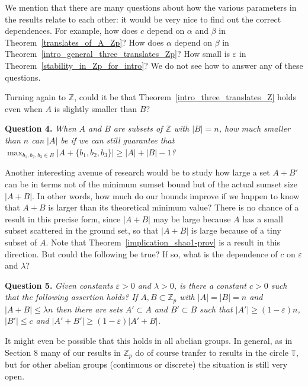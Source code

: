 \documentclass[12pt,reqno]{amsart}
\theoremstyle{definition}
\renewcommand\le{\leqslant}
\renewcommand\ge{\geqslant}
\begin{document}
\vspace{10pt}
We mention that there are many questions about how the various parameters in the results relate to each
other: it would be very nice to find out the correct dependences. For example, how does $c$ depend on $\alpha$ and $\beta$ in Theorem~\ref{translates_of_A_Zp}? How does $\alpha$ depend on $\beta$ in
Theorem~\ref{intro_general_three_translates_Zp}? How small is $\varepsilon$ in
Theorem~\ref{stability_in_Zp_for_intro}? We do not see how to answer any of these questions.

\vspace{5pt}
Turning again to ${\mathbb Z}$, could it be that Theorem~\ref{intro_three_translates_Z} holds
even when $A$ is slightly smaller than $B$?

\vspace{5pt}
{\bf Question 4. }{\em
  When $A$ and $B$ are subsets of ${\mathbb Z}$ with $|B|=n$, how much smaller than $n$ can $|A|$
  be if we can still guarantee that $\max_{b_1,b_2,b_3 \in B}\bigg|A+\{b_1,b_2,b_3\}\bigg| \ge
 |A|+|B|-1$?
  }

\vspace{5pt}
Another interesting avenue of research would be to study how large a set $A + B'$ can
be in terms not of the minimum sumset bound but of the actual sumset size $|A+B|$. In other words,
how much do our bounds improve if we happen to know that $A+B$ is larger than its theoretical
minimum value? There is no chance of a result in this precise form, since $|A+B|$ may be large because $A$ has a small subset scattered in the ground set, so that $|A+B|$ is large because of a tiny subset of $A$. Note that Theorem~\ref{implication_shao1-prov} is a result in this direction. But could the
following be true? If so, what is the dependence of $c$ on $\varepsilon$ and $\lambda$?

\vspace{5pt}
{\bf Question 5. }{\em
Given constants $\varepsilon >0$ and
$\lambda >0$, is there a constant $c>0$ such that the following assertion
holds?
If $A, B \subset {\mathbb Z}_p$ with $|A|=|B|=n$ and $|A+B|\le \lambda
n$ then there are sets $A'\subset A$ and $B'\subset B$ such that $|A'|\ge
(1-\varepsilon)n$, $|B'|\le c$ and $|A'+B'|\ge (1-\varepsilon) |A'+B|$.
}

\vspace{5pt}
It might even be possible that this holds in all abelian groups. In general, as in Section 8 many of our
results in
${\mathbb Z}_p$ do of course tranfer to results in the circle ${\mathbb T}$, but for other abelian groups (continuous or
discrete) the situation is still very open.
\end{document}
